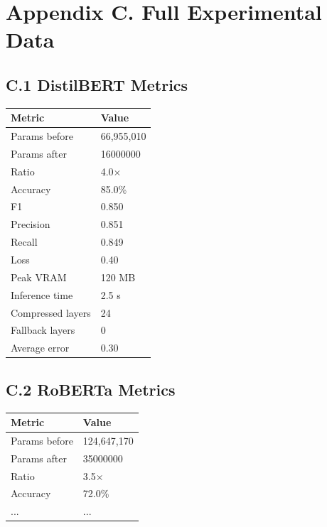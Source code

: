 
\section{Appendix C. Full Experimental Data}

\subsection{C.1 DistilBERT Metrics}

\begin{table}[H]
\centering
\small
\begin{tabular}{ll}
\toprule
\textbf{Metric} & \textbf{Value} \\
\midrule
Params before & 66,955,010 \\
Params after & 16000000 \\
Ratio & 4.0$\times$ \\
Accuracy & 85.0\% \\
F1 & 0.850 \\
Precision & 0.851 \\
Recall & 0.849 \\
Loss & 0.40 \\
Peak VRAM & 120 MB \\
Inference time & 2.5 s \\
Compressed layers & 24 \\
Fallback layers & 0 \\
Average error & 0.30 \\
\bottomrule
\end{tabular}
\end{table}

\subsection{C.2 RoBERTa Metrics}

\begin{table}[H]
\centering
\small
\begin{tabular}{ll}
\toprule
\textbf{Metric} & \textbf{Value} \\
\midrule
Params before & 124,647,170 \\
Params after & 35000000 \\
Ratio & 3.5$\times$ \\
Accuracy & 72.0\% \\
... & ... \\
\bottomrule
\end{tabular}
\end{table}

